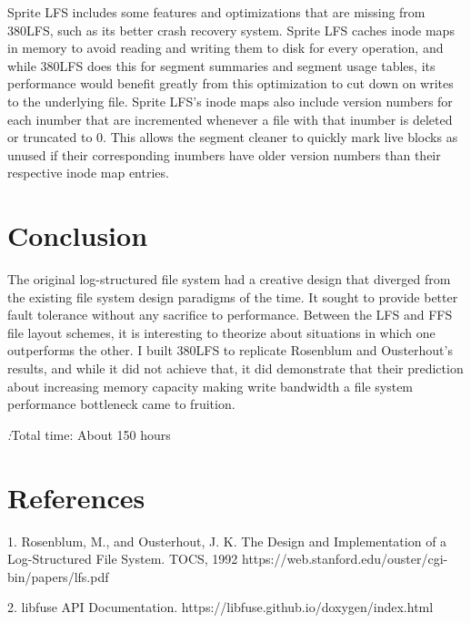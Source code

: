 \documentclass{article}
\begin{document}
Sprite LFS includes some features and optimizations that are missing from 380LFS, such as its better crash recovery system. Sprite LFS caches inode maps in memory to avoid reading and writing them to disk for every operation, and while 380LFS does this for segment summaries and segment usage tables, its performance would benefit greatly from this optimization to cut down on writes to the underlying file. Sprite LFS's inode maps also include version numbers for each inumber that are incremented whenever a file with that inumber is deleted or truncated to 0. This allows the segment cleaner to quickly mark live blocks as unused if their corresponding inumbers have older version numbers than their respective inode map entries.

\section{Conclusion}

The original log-structured file system had a creative design that diverged from the existing file system design paradigms of the time. It sought to provide better fault tolerance without any sacrifice to performance. Between the LFS and FFS file layout schemes, it is interesting to theorize about situations in which one outperforms the other. I built 380LFS to replicate Rosenblum and Ousterhout's results, and while it did not achieve that, it did demonstrate that their prediction about increasing memory capacity making write bandwidth a file system performance bottleneck came to fruition.

\textit:{Total time: About 150 hours}

\section{References}

1. Rosenblum, M., and Ousterhout, J. K. The Design and Implementation of a Log-Structured File System. TOCS, 1992 https://web.stanford.edu/ouster/cgi-bin/papers/lfs.pdf

2. libfuse API Documentation. https://libfuse.github.io/doxygen/index.html
\end{document}
